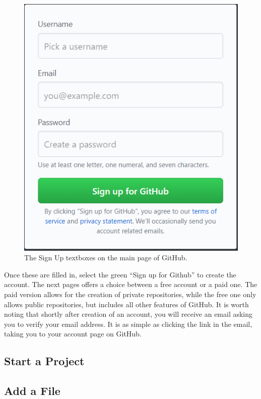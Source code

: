 \documentclass[11pt]{article}
\begin{document}
\begin{figure}[h!]
\begin{center}
\includegraphics[scale=.5]{GithubSignup.png} 
\caption{The Sign Up textboxes on the main page of GitHub.}
\end{center}
\end{figure} 

Once these are filled in, select the green ``Sign up for Github'' to create the account. The next pages offers a choice between a free account or a paid one. The paid version allows for the creation of private repositories, while the free one only allows public repositories, but includes all other features of GitHub. It is worth noting that shortly after creation of an account, you will receive an email asking you to verify your email address. It is as simple as clicking the link in the email, taking you to your account page on GitHub.
\subsection{Start a Project}

\subsection{Add a File}
\end{document}
